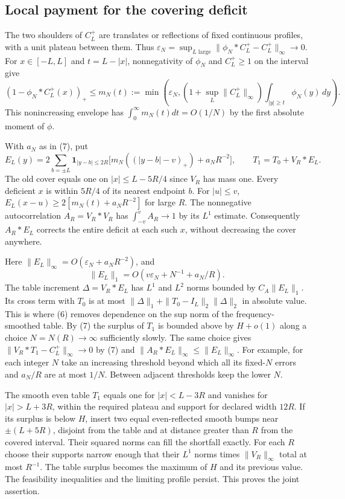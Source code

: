 \documentclass[11pt]{article}
\begin{document}
\subsection{Local payment for the covering deficit}

The two shoulders of \(C_L^+\) are translates or reflections of fixed continuous profiles, with a unit plateau between them. Thus \(\varepsilon_N=\sup_{L\text{ large}}\|\phi_N*C_L^+-C_L^+\|_\infty\to0\). For \(x\in[-L,L]\) and \(t=L-|x|\), nonnegativity of \(\phi_N\) and \(C_L^+\ge1\) on the interval give
\[
 (1-\phi_N*C_L^+(x))_+\le m_N(t)
 :=\min\!\left(\varepsilon_N,(1+\sup_L\|C_L^+\|_\infty)
                         \int_{|y|\ge t}\phi_N(y)\,dy\right).
\]
This nonincreasing envelope has \(\int_0^\infty m_N(t)dt=O(1/N)\) by the first absolute moment of \(\phi\).

With \(a_N\) as in (7), put
\[
 E_L(y)=2\sum_{b=\pm L}
 \mathbf1_{|y-b|\le2R}\big[m_N((|y-b|-v)_+)+a_N R^{-2}\big],
 \qquad  T_1=T_0+V_R*E_L .
\]
The old cover equals one on \(|x|\le L-5R/4\) since \(V_R\) has mass one. Every deficient \(x\) is within \(5R/4\) of its nearest endpoint \(b\). For \(|u|\le v\), \(E_L(x-u)\ge2[m_N(t)+a_N R^{-2}]\) for large \(R\). The nonnegative autocorrelation \(A_R=V_R*V_R\) has \(\int_{-v}^v A_R\to1\) by its \(L^1\) estimate. Consequently \(A_R*E_L\) corrects the entire deficit at each such \(x\), without decreasing the cover anywhere.

Here \(\|E_L\|_\infty=O(\varepsilon_N+a_N R^{-2})\), and
\[
 \|E_L\|_1=O(v\varepsilon_N+N^{-1}+a_N/R).
\]
The table increment \(\Delta=V_R*E_L\) has \(L^1\) and \(L^2\) norms bounded by \(C_A\|E_L\|_1\). Its cross term with \(T_0\) is at most \(\|\Delta\|_1+\|T_0-I_L\|_2\|\Delta\|_2\) in absolute value. This is where (6) removes dependence on the sup norm of the frequency-smoothed table. By (7) the surplus of \(T_1\) is bounded above by \(H+o(1)\) along a choice \(N=N(R)\to\infty\) sufficiently slowly. The same choice gives \(\|V_R*T_1-C_L^+\|_\infty\to0\) by (7) and \(\|A_R*E_L\|_\infty\le\|E_L\|_\infty\). For example, for each integer \(N\) take an increasing threshold beyond which all its fixed-\(N\) errors and \(a_N/R\) are at most \(1/N\). Between adjacent thresholds keep the lower \(N\).

The smooth even table \(T_1\) equals one for \(|x|<L-3R\) and vanishes for \(|x|>L+3R\), within the required plateau and support for declared width \(12R\). If its surplus is below \(H\), insert two equal even-reflected smooth bumps near \(\pm(L+5R)\), disjoint from the table and at distance greater than \(R\) from the covered interval. Their squared norms can fill the shortfall exactly. For each \(R\) choose their supports narrow enough that their \(L^1\) norms times \(\|V_R\|_\infty\) total at most \(R^{-1}\). The table surplus becomes the maximum of \(H\) and its previous value. The feasibility inequalities and the limiting profile persist. This proves the joint assertion.
\end{document}
